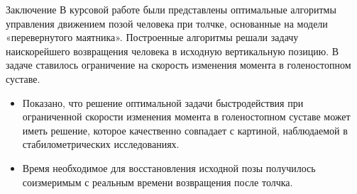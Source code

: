 \documentclass[10pt]{beamer}
\begin{document}
\begin{frame}{Заключение}
	В курсовой работе были представлены оптимальные алгоритмы управления
	движением позой человека при толчке, основанные на модели
	«перевернутого маятника». Построенные алгоритмы решали задачу наискорейшего возвращения человека в исходную вертикальную позицию.
	В задаче ставилось ограничение на скорость изменения момента в голеностопном суставе.
	\begin{itemize}
		\item Показано, что решение оптимальной задачи быстродействия при ограниченной скорости изменения момента в голеностопном суставе может иметь решение, которое качественно совпадает с картиной, наблюдаемой в стабилометрических исследованиях.
		\item Время необходимое для восстановления исходной позы получилось соизмеримым с реальным времени возвращения после толчка.
	\end{itemize}

\end{frame}
\end{document}
